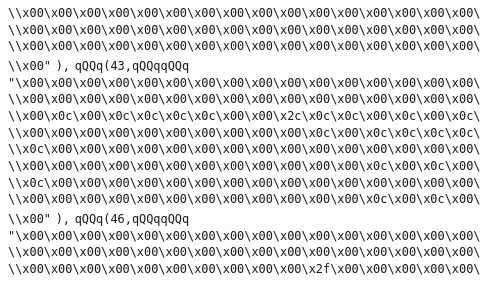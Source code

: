 \verb|\\x00\x00\x00\x00\x00\x00\x00\x00\x00\x00\x00\x00\x00\x00\x00\x00\|\newline
\verb|\\x00\x00\x00\x00\x00\x00\x00\x00\x00\x00\x00\x00\x00\x00\x00\x00\|\newline
\verb|\\x00\x00\x00\x00\x00\x00\x00\x00\x00\x00\x00\x00\x00\x00\x00\x00\|\newline
\verb|\\x00"|\newline
\verb|),|\newline
\verb|qQQq(43,qQQqqQQq|\newline
\verb|"\x00\x00\x00\x00\x00\x00\x00\x00\x00\x00\x00\x00\x00\x00\x00\x00\|\newline
\verb|\\x00\x00\x00\x00\x00\x00\x00\x00\x00\x00\x00\x00\x00\x00\x00\x00\|\newline
\verb|\\x00\x0c\x00\x0c\x0c\x0c\x0c\x00\x00\x2c\x0c\x0c\x00\x0c\x00\x0c\|\newline
\verb|\\x00\x00\x00\x00\x00\x00\x00\x00\x00\x00\x0c\x00\x0c\x0c\x0c\x0c\|\newline
\verb|\\x0c\x00\x00\x00\x00\x00\x00\x00\x00\x00\x00\x00\x00\x00\x00\x00\|\newline
\verb|\\x00\x00\x00\x00\x00\x00\x00\x00\x00\x00\x00\x00\x0c\x00\x0c\x00\|\newline
\verb|\\x0c\x00\x00\x00\x00\x00\x00\x00\x00\x00\x00\x00\x00\x00\x00\x00\|\newline
\verb|\\x00\x00\x00\x00\x00\x00\x00\x00\x00\x00\x00\x00\x0c\x00\x0c\x00\|\newline
\verb|\\x00"|\newline
\verb|),|\newline
\verb|qQQq(46,qQQqqQQq|\newline
\verb|"\x00\x00\x00\x00\x00\x00\x00\x00\x00\x00\x00\x00\x00\x00\x00\x00\|\newline
\verb|\\x00\x00\x00\x00\x00\x00\x00\x00\x00\x00\x00\x00\x00\x00\x00\x00\|\newline
\verb|\\x00\x00\x00\x00\x00\x00\x00\x00\x00\x00\x2f\x00\x00\x00\x00\x00\|\newline
